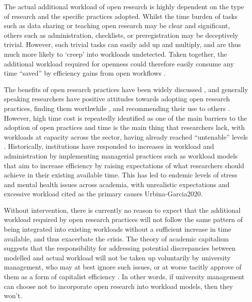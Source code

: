 \documentclass[meta, authordate]{jote-new-article}
\begin{document}
The actual additional workload of open research is highly dependent on the type of research and the specific practices adopted. Whilst the time burden of tasks such as data sharing or teaching open research may be clear and significant, others such as administration, checklists, or preregistration may be deceptively trivial. However, such trivial tasks can easily add up and multiply, and are thus much more likely to ‘creep’ into workloads undetected. Taken together, the additional workload required for openness could therefore easily consume any time “saved” by efficiency gains from open workflows \parencites{Lowndes2017}.



The benefits of open research practices have been widely discussed \parencites{Munafò2017}, and generally speaking researchers have positive attitudes towards adopting open research practices, finding them worthwhile \parencites{Eynden2016}{Lowndes2017}, and recommending their use to others \parencites{Sarafoglou2022}. However, high time cost is repeatedly identified as one of the main barriers to the adoption of open practices \parencites{Eynden2016}{Gownaris2022}{Tenopir2011} and time is the main thing that researchers lack, with workloads at capacity across the sector, having already reached “untenable” levels \parencites{Long2020}{Papadopoulos2017}. Historically, institutions have responded to increases in workload and administration by implementing managerial practices such as workload models that aim to increase efficiency by raising expectations of what researchers should achieve in their existing available time. This has led to endemic levels of stress and mental health issues across academia, with unrealistic expectations and excessive workload cited as the primary causes \parencites{Nicholls2022}{Urbina‐Garcia2020}.



Without intervention, there is currently no reason to expect that the additional workload required by open research practices will not follow the same pattern of being integrated into existing workloads without a sufficient increase in time available, and thus exacerbate the crisis. The theory of academic capitalism suggests that the responsibility for addressing potential discrepancies between modelled and actual workload will not be taken up voluntarily by university management, who may at best ignore such issues, or at worse tacitly approve of them as a form of capitalist efficiency \parencites{Lyons2010}. In other words, if university management can choose not to incorporate open research into workload models, then they won’t.
\end{document}
